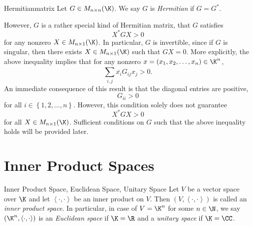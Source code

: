 \documentclass[linearalgebra]{subfiles}
\begin{document}
    \begin{definition}{Hermitian}{matrix}
        Let $G\in M_{n\times n}(\K)$. We say $G$ is \emph{Hermitian} if $G=G^*$.
    \end{definition}

    \noindent However, $G$ is a rather special kind of Hermitian matrix, that $G$ satisfies
    \begin{equation*}
        X^*GX > 0
    \end{equation*}
    for any nonzero $X\in M_{n\times 1}(\K)$. In particular, $G$ is invertible, since if $G$ is singular, then there exists $X\in M_{n\times 1}(\K)$ such that $GX = 0$. More explicitly, the above inequality implies that for any nonzero $x = \left( x_1,x_2,\ldots,x_n \right) \in\K^n$,
    \begin{equation*}
        \sum^{}_{i,j} \overline{x_i}G_{ij}x_j > 0.
    \end{equation*}
    An immediate consequence of this result is that the diagonal entries are positive,
    \begin{equation*}
        G_{ii} > 0
    \end{equation*}
    for all $i\in \left\lbrace 1,2,\ldots,n \right\rbrace$. However, this condition solely does not guarantee
    \begin{equation*}
        X^*GX > 0
    \end{equation*}
    for all $X\in M_{n\times 1}(\K)$. Sufficient conditions on $G$ such that the above inequality holds will be provided later. 

    \section{Inner Product Spaces}
    
    \begin{definition}{Inner Product Space, Euclidean Space, Unitary Space}{}
        Let $V$ be a vector space over $\K$ and let $\left\langle \cdot, \cdot\right\rangle$ be an inner product on $V$. Then $\left( V, \left\langle \cdot, \cdot\right\rangle \right) $ is called an \emph{inner product space}. In particular, in case of $V=\K^n$ for some $n\in\N$, we say $\left( \K^n,\left\langle \cdot, \cdot\right\rangle  \right)$ is an \emph{Euclidean space} if $\K = \R$ and a \emph{unitary space} if $\K = \CC$.
    \end{definition}
\end{document}
